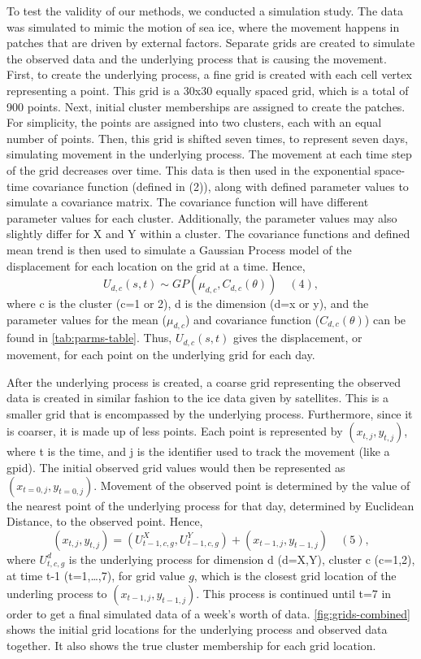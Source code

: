 \documentclass[12pt]{article}
\begin{document}
To test the validity of our methods, we conducted a simulation study.
The data was simulated to mimic the motion of sea ice, where the
movement happens in patches that are driven by external factors.
Separate grids are created to simulate the observed data and the
underlying process that is causing the movement. First, to create the
underlying process, a fine grid is created with each cell vertex
representing a point. This grid is a 30x30 equally spaced grid, which is
a total of 900 points. Next, initial cluster memberships are assigned to
create the patches. For simplicity, the points are assigned into two
clusters, each with an equal number of points. Then, this grid is
shifted seven times, to represent seven days, simulating movement in the
underlying process. The movement at each time step of the grid decreases
over time. This data is then used in the exponential space-time
covariance function (defined in (2)), along with defined parameter
values to simulate a covariance matrix. The covariance function will
have different parameter values for each cluster. Additionally, the
parameter values may also slightly differ for X and Y within a cluster.
The covariance functions and defined mean trend is then used to simulate
a Gaussian Process model of the displacement for each location on the
grid at a time.
Hence,\[ U_{d,c}(s,t) \sim GP(\mu_{d,c}, C_{d,c}(\theta)) \quad (4),\]
where c is the cluster (c=1 or 2), d is the dimension (d=x or y), and
the parameter values for the mean (\(\mu_{d,c}\)) and covariance
function (\(C_{d,c}(\theta)\)) can be found in \cref{tab:parms-table}.
Thus, \(U_{d,c}(s,t)\) gives the displacement, or movement, for each
point on the underlying grid for each day.

After the underlying process is created, a coarse grid representing the
observed data is created in similar fashion to the ice data given by
satellites. This is a smaller grid that is encompassed by the underlying
process. Furthermore, since it is coarser, it is made up of less points.
Each point is represented by \((x_{t,j}, y_{t,j})\), where t is the
time, and j is the identifier used to track the movement (like a gpid).
The initial observed grid values would then be represented as
\((x_{t=0,j}, y_{t=0,j})\). Movement of the observed point is determined
by the value of the nearest point of the underlying process for that
day, determined by Euclidean Distance, to the observed point. Hence,
\[(x_{t,j}, y_{t,j}) = (U^{X}_{t-1,c,g}, U^{Y}_{t-1,c,g}) + (x_{t-1,j}, y_{t-1,j}) \quad (5),\]
where \(U^d_{t,c,g}\) is the underlying process for dimension d (d=X,Y),
cluster c (c=1,2), at time t-1 (t=1,\ldots,7), for grid value \(g\),
which is the closest grid location of the underling process to
\((x_{t-1,j}, y_{t-1,j})\). This process is continued until t=7 in order
to get a final simulated data of a week's worth of data.
\cref{fig:grids-combined} shows the initial grid locations for the
underlying process and observed data together. It also shows the true
cluster membership for each grid location.
\end{document}
